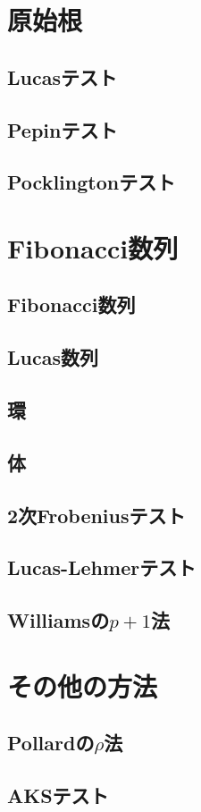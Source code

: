 \section{原始根}
\subsection{Lucasテスト}

\subsection{Pepinテスト}

\subsection{Pocklingtonテスト}


\section{Fibonacci数列}
\subsection{Fibonacci数列}

\subsection{Lucas数列}

\subsection{環}

\subsection{体}

\subsection{2次Frobeniusテスト}

\subsection{Lucas-Lehmerテスト}

\subsection{Williamsの$p+1$法}


\section{その他の方法}
\subsection{Pollardの$\rho$法}

\subsection{AKSテスト}


\newpage
\printindex



